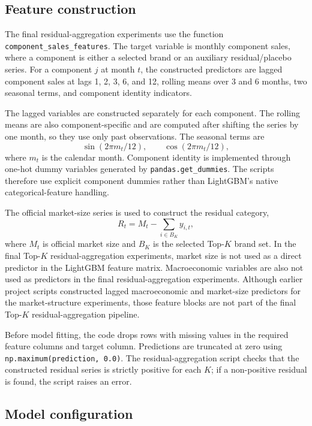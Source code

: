 \subsection{Feature construction}
\label{app:feature-construction}

The final residual-aggregation experiments use the function \texttt{component\_sales\_features}. The target variable is monthly component sales, where a component is either a selected brand or an auxiliary residual/placebo series. For a component \(j\) at month \(t\), the constructed predictors are lagged component sales at lags 1, 2, 3, 6, and 12, rolling means over 3 and 6 months, two seasonal terms, and component identity indicators.

The lagged variables are constructed separately for each component. The rolling means are also component-specific and are computed after shifting the series by one month, so they use only past observations. The seasonal terms are
\[
\sin(2\pi m_t/12), \qquad \cos(2\pi m_t/12),
\]
where \(m_t\) is the calendar month. Component identity is implemented through one-hot dummy variables generated by \texttt{pandas.get\_dummies}. The scripts therefore use explicit component dummies rather than LightGBM's native categorical-feature handling.

The official market-size series is used to construct the residual category,
\[
R_t = M_t - \sum_{i \in B_K} y_{i,t},
\]
where \(M_t\) is official market size and \(B_K\) is the selected Top-\(K\) brand set. In the final Top-\(K\) residual-aggregation experiments, market size is not used as a direct predictor in the LightGBM feature matrix. Macroeconomic variables are also not used as predictors in the final residual-aggregation experiments. Although earlier project scripts constructed lagged macroeconomic and market-size predictors for the market-structure experiments, those feature blocks are not part of the final Top-\(K\) residual-aggregation pipeline.

Before model fitting, the code drops rows with missing values in the required feature columns and target column. Predictions are truncated at zero using \texttt{np.maximum(prediction, 0.0)}. The residual-aggregation script checks that the constructed residual series is strictly positive for each \(K\); if a non-positive residual is found, the script raises an error.

\subsection{Model configuration}
\label{app:model-configuration}

